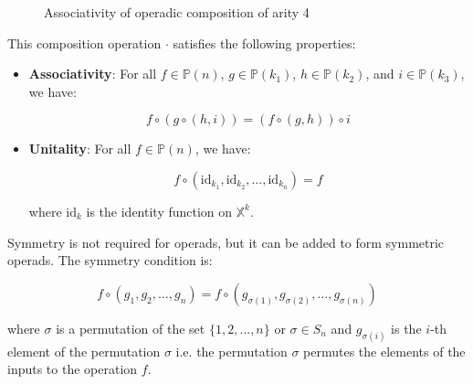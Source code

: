\begin{figure}[h]
\caption{Associativity of operadic composition of arity 4}
\label{fig:arity-4-associativity}
\end{figure}

This composition operation $\cdot$ satisfies the following properties:

\begin{itemize}
  \item \textbf{Associativity}: For all $f \in \mathbb{P}(n)$, $g \in \mathbb{P}(k_1)$, $h \in \mathbb{P}(k_2)$, and $i \in \mathbb{P}(k_3)$, we have:

  \begin{equation}
    f \circ (g \circ (h, i)) = (f \circ (g, h)) \circ i
  \end{equation}

  \item \textbf{Unitality}: For all $f \in \mathbb{P}(n)$, we have:

  \begin{equation}
    f \circ (\text{id}_{k_1}, \text{id}_{k_2}, \ldots, \text{id}_{k_n}) = f
  \end{equation}

  where $\text{id}_k$ is the identity function on $\mathbb{X}^k$.
\end{itemize}

Symmetry is not required for operads, but it can be added to form symmetric operads. The symmetry condition is:

\begin{equation}
  f \circ (g_1, g_2, \ldots, g_n) = f \circ (g_{\sigma(1)}, g_{\sigma(2)}, \ldots, g_{\sigma(n)})
\end{equation}

where $\sigma$ is a permutation of the set $\{1, 2, \ldots, n\}$ or $\sigma \in S_n$ and $g_{\sigma(i)}$ is the $i$-th element of the permutation $\sigma$ i.e. the permutation $\sigma$ permutes the elements of the inputs to the operation $f$.

